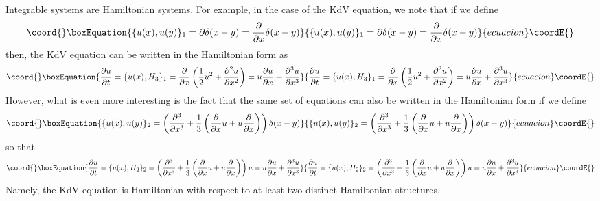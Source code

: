 \documentclass[a4paper,11pt]{article}
\begin{document}
Integrable systems are Hamiltonian systems. For example, in the case
of the KdV equation, we note that if we define
\begin{equation}\coord{}\boxEquation{
\{u(x) , u(y) \}_{1} = \partial \delta (x-y) = {\partial \over \partial x}
\delta (x-y)
}{
\{u(x) , u(y) \}_{1} = \partial \delta (x-y) = {\partial \over \partial x}
\delta (x-y)
}{ecuacion}\coordE{}\end{equation}
then, the KdV equation can be written in the Hamiltonian form as
\begin{equation}\coord{}\boxEquation{
{\partial u\over \partial t} = \{ u (x) , H_{3}\}_{1} = {\partial\over
\partial x} \left({1\over 2} u^{2} + {\partial^{2} u\over \partial
x^{2}}\right) = u {\partial u\over \partial x} + {\partial^{3} u\over
\partial x^{3}}
}{
{\partial u\over \partial t} = \{ u (x) , H_{3}\}_{1} = {\partial\over
\partial x} \left({1\over 2} u^{2} + {\partial^{2} u\over \partial
x^{2}}\right) = u {\partial u\over \partial x} + {\partial^{3} u\over
\partial x^{3}}
}{ecuacion}\coordE{}\end{equation} 
However, what is even more interesting is the fact that the same set
of equations can also be written in the Hamiltonian form if we define
\begin{equation}\coord{}\boxEquation{
\{ u(x) , u(y) \}_{2} = \left({\partial^{3}\over \partial x^{3}} +
{1\over 3} \left({\partial\over \partial x} u + u {\partial\over
\partial x}\right)\right) \delta (x-y)
}{
\{ u(x) , u(y) \}_{2} = \left({\partial^{3}\over \partial x^{3}} +
{1\over 3} \left({\partial\over \partial x} u + u {\partial\over
\partial x}\right)\right) \delta (x-y)
}{ecuacion}\coordE{}\end{equation}
so that
\begin{equation}\coord{}\boxEquation{
{\partial u\over \partial t} = \{ u(x) , H_{2}\}_{2} =
\left({\partial^{3}\over \partial x^{3}} + {1\over
3}\left({\partial\over \partial x} u + u {\partial\over \partial
x}\right)\right) u = u {\partial u\over \partial x} + {\partial^{3}
u\over \partial x^{3}}
}{
{\partial u\over \partial t} = \{ u(x) , H_{2}\}_{2} =
\left({\partial^{3}\over \partial x^{3}} + {1\over
3}\left({\partial\over \partial x} u + u {\partial\over \partial
x}\right)\right) u = u {\partial u\over \partial x} + {\partial^{3}
u\over \partial x^{3}}
}{ecuacion}\coordE{}\end{equation}
Namely, the KdV equation is Hamiltonian with respect to at least two
distinct Hamiltonian structures.
\end{document}
